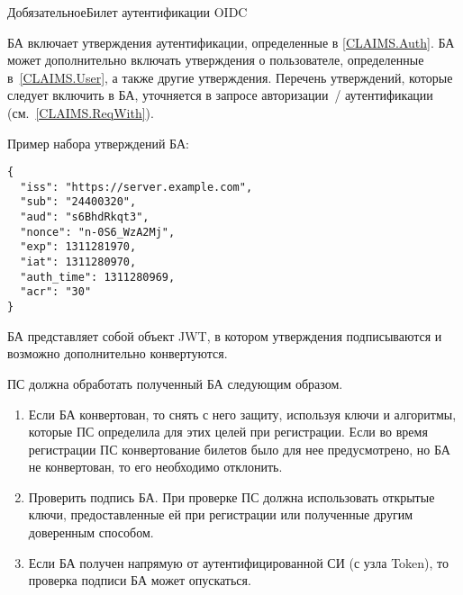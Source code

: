 \begin{appendix}{Д}{обязательное}{Билет аутентификации OIDC}\label{IDTOKEN}

\label{IDTOKEN.Structure}

БА включает утверждения аутентификации, определенные в \ref{CLAIMS.Auth}.
БА может дополнительно включать утверждения о пользователе, 
определенные в~\ref{CLAIMS.User}, а также другие утверждения.
% 
Перечень утверждений, которые следует включить в БА, уточняется в 
запросе авторизации~/ аутентификации (см.~\ref{CLAIMS.ReqWith}).

Пример набора утверждений БА:
\begin{lstlisting}
{
  "iss": "https://server.example.com",
  "sub": "24400320",
  "aud": "s6BhdRkqt3",
  "nonce": "n-0S6_WzA2Mj",
  "exp": 1311281970,
  "iat": 1311280970,
  "auth_time": 1311280969,
  "acr": "30"
}
\end{lstlisting}

БА представляет собой объект JWT, в котором утверждения подписываются и возможно 
дополнительно конвертуются.

%
%

\label{IDTOKEN.Process}

ПС должна обработать полученный БА следующим образом.

\begin{enumerate}
\item 
Если БА конвертован, то снять с него защиту, используя ключи и алгоритмы, 
которые ПС определила для этих целей при регистрации.
%
Если во время регистрации ПС конвертование билетов было для нее
предусмотрено, но БА не конвертован, то его необходимо отклонить.

\item 
Проверить подпись БА. При проверке ПС должна использовать открытые ключи, 
предоставленные ей при регистрации или полученные другим доверенным способом. 

\item 
Если БА получен напрямую от аутентифицированной СИ (с узла Token), 
то проверка подписи БА может опускаться.


\end{enumerate}
\end{appendix}

